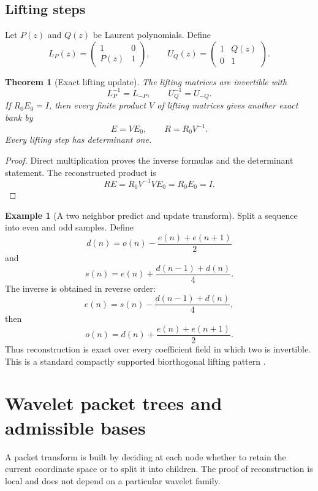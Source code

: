 \documentclass{aomart}
\newtheorem{theorem}{Theorem}[section]
\theoremstyle{definition}
\newtheorem{example}[example]{Example}
\theoremstyle{remark}
\begin{document}
\subsection{Lifting steps}

Let \(P(z)\) and \(Q(z)\) be Laurent polynomials. Define
\[
L_P(z)
=
\begin{pmatrix}
1&0\\
P(z)&1
\end{pmatrix},
\qquad
U_Q(z)
=
\begin{pmatrix}
1&Q(z)\\
0&1
\end{pmatrix}.
\]

\begin{theorem}[Exact lifting update]\label{thm:lifting_update}
The lifting matrices are invertible with
\[
L_P^{-1}=L_{-P},
\qquad
U_Q^{-1}=U_{-Q}.
\]
If \(R_0E_0=I\), then every finite product \(V\) of lifting matrices gives another exact bank by
\[
E=VE_0,
\qquad
R=R_0V^{-1}.
\]
Every lifting step has determinant one.
\end{theorem}

\begin{proof}
Direct multiplication proves the inverse formulas and the determinant statement. The reconstructed product is
\[
RE
=R_0V^{-1}VE_0
=R_0E_0
=I.
\]
\end{proof}

\begin{example}[A two neighbor predict and update transform]\label{ex:predict_update}
Split a sequence into even and odd samples. Define
\[
d(n)
=o(n)-\frac{e(n)+e(n+1)}2
\]
and
\[
s(n)
=e(n)+\frac{d(n-1)+d(n)}4.
\]
The inverse is obtained in reverse order:
\[
e(n)
=s(n)-\frac{d(n-1)+d(n)}4,
\]
then
\[
o(n)
=d(n)+\frac{e(n)+e(n+1)}2.
\]
Thus reconstruction is exact over every coefficient field in which two is invertible. This is a standard compactly supported biorthogonal lifting pattern \cite{CohenDaubechiesFeauveau1992,Sweldens1996,DaubechiesSweldens1998}.
\end{example}

\section{Wavelet packet trees and admissible bases}\label{sec:packet_trees}

A packet transform is built by deciding at each node whether to retain the current coordinate space or to split it into children. The proof of reconstruction is local and does not depend on a particular wavelet family.
\end{document}
